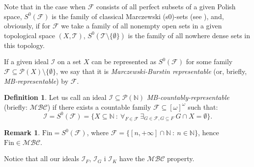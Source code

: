 \documentclass{amsart}
\theoremstyle{definition}
\newtheorem{df}{Definition}
\newtheorem{remark}{Remark}
\theoremstyle{definition}
\newcommand{\N}{{\mathbb N}}
\newcommand{\Fin}{\textrm{Fin}}
\newcommand{\I}{\mathcal I}
\newcommand{\J}{\mathcal J}
\newcommand{\T}{\mathcal{T}}
\DeclareMathOperator{\Exists}{\exists}
\DeclareMathOperator{\Forall}{\forall}
\newcommand{\MB}{S^0}  %
\newcommand{\MBC}{\mathcal{MBC}}
\begin{document}
Note that in the case when $\mathcal{F}$ consists of all perfect subsets of a given Polish space, $\MB(\mathcal{F})$ is the family of classical Marczewski (s0)-sets (see \cite{Sz}), and, obviously, if for $\mathcal{F}$ we take a family of all nonempty open sets in a given topological space $(X,\T)$, $\MB(\T\setminus\{\emptyset\})$ is the family of all nowhere dense sets in this topology.

If a given ideal $\I$ on a set $X$ can be represented as $\MB(\mathcal{F})$ for some family $\mathcal{F}\subseteq \mathcal{P}(X)\setminus\{\emptyset\}$, we say that it is \emph{Marczewski-Burstin representable} (or, briefly, \emph{MB-representable}) by $\mathcal{F}$.

\begin{df}
Let us call an ideal $\I\subseteq \mathcal{P}(\N)$  \emph{MB-countably-representable} (briefly: $\MBC$) if there exists a countable family $\mathcal{F}\subseteq [\omega]^\omega$ such that:
$$\I = \MB(\mathcal{F}) = \{X\subseteq\N\ :\ \Forall_{F\in\mathcal{F}}\ \Exists_{G\in\mathcal{F}, G\subseteq F}\ G\cap X=\emptyset\}.$$
\end{df}

\begin{remark} 
$\Fin = \MB(\mathcal{F})$, where $\mathcal{F}= \{[n, +\infty]\cap\N\ :\ n\in\N\}$, hence $\Fin\in \MBC$.
\end{remark}

Notice that all our ideals $\I_F$, $\I_G$ i $\I_K$ have the $\MBC$ property.

\end{document}
